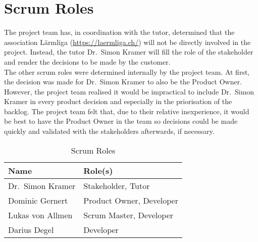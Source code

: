 \section{Scrum Roles}\label{sec:scrum_roles}
The project team has, in coordination with the tutor, determined that the association Lärmliga (\url{https://laermliga.ch/}) will not be directly involved
in the project. Instead, the tutor Dr.\ Simon Kramer will fill the role of the stakeholder and render the decisions to be made by the customer. \\
The other scrum roles were determined internally by the project team. At first, the decision was made for Dr.\ Simon Kramer to also be the Product Owner.
However, the project team realised it would be impractical to include Dr.\ Simon Kramer in every product decision and especially in the priorisation of the backlog.
The project team felt that, due to their relative inexperience, it would be best to have the Product Owner in the team so decisions could be made quickly and validated
with the stakeholders afterwards, if necessary.
\begin{table}[H]
    \centering
    \begin{tabular}{l l}
        \toprule
        \textbf{Name}     & \textbf{Role(s)}         \\
        \midrule
        Dr.\ Simon Kramer & Stakeholder, Tutor       \\
        \midrule
        Dominic Gernert   & Product Owner, Developer \\
        \midrule
        Lukas von Allmen  & Scrum Master, Developer  \\
        \midrule
        Darius Degel      & Developer                \\
        \bottomrule
    \end{tabular}
    \caption{Scrum Roles}\label{table:scrum_roles}
\end{table}